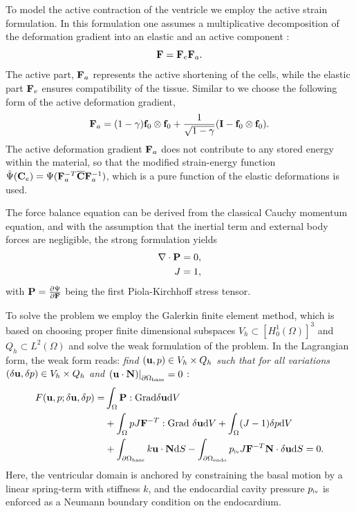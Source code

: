 To model the active contraction of the ventricle we employ the active
strain formulation. In this formulation one assumes a multiplicative 
decomposition of the deformation gradient into an elastic
and an active component \cite{ambrosi2011electromechanical}:
\begin{equation}
 \mathbf{F} = \mathbf{F}_e \mathbf{F}_a.
\label{paper4:eq:active_strain}
\end{equation}
The active part, $\mathbf{F}_a$ represents the active shortening of the cells,
while the elastic part $\mathbf{F}_e$ ensures compatibility of the tissue.
Similar to \cite{balaban2017high} we choose the following form of the active
deformation gradient,
\begin{equation}
  \mathbf{F}_a = (1 - \gamma) \mathbf{f}_0 \otimes \mathbf{f}_0  + \frac{1}{\sqrt{1 - \gamma}} (\mathbf{I} - \mathbf{f}_0 \otimes \mathbf{f}_0).
 \label{paper4:eq:active_strain_Fa_gjerald}
\end{equation}
The active deformation gradient $\mathbf{F}_a$ does not contribute to any
stored energy within the material, so that the modified
strain-energy function $\tilde{\Psi}(\mathbf{C}_e) = \Psi(\mathbf{F}_a^{-T} \overline{\mathbf{C}}
\mathbf{F}_a^{-1})$, which is a pure function of the elastic deformations is used.

The force balance equation can be derived from the classical Cauchy
momentum equation, and with the assumption that the inertial term and
external body forces are negligible, the strong formulation yields
\begin{align}
  \nabla \cdot \mathbf{P} &= 0, \\
  J &= 1, 
\end{align}
with $\mathbf{P} = \frac{\partial \Psi}{\partial \mathbf{F}}$ being the first
Piola-Kirchhoff stress tensor. 

To solve the problem we employ the Galerkin finite element method, which is based
on choosing proper finite dimensional subspaces $V_h \subset [H_0^1(\Omega)]^3$ and
$Q_h \subset L^2(\Omega)$ and solve the weak formulation of the problem. In
the Lagrangian form, the weak form reads: {\it find $(\mathbf{u},p)
\in V_h\times Q_h$ such that for all variations $(\delta
\mathbf{u}, \delta p) \in V_h \times Q_h $ and $\left. \left( \mathbf{u} \cdot \mathbf{N} \right)
\right|_{\partial \Omega_{\mathrm{base}}} = 0$ }:
\begin{align}
\begin{split}
  F(\mathbf{u}, p;\delta \mathbf{u}, \delta p) =
  &\int_{\Omega} \mathbf{P} :  \mathrm{Grad} \delta \mathbf{u}  \mathrm{d} V  \\
  &+\int_{\Omega} p J \mathbf{F}^{-T} : \mathrm{Grad} \ \delta \mathbf{u}   \mathrm{d} V  
  +\int_{\Omega} (J - 1) \delta p \mathrm{d} V \\
  &+\int_{\partial \Omega_{\text{base}}} k \mathbf{u} \cdot \mathbf{N} \mathrm{d}S
  - \int_{\partial \Omega_{\text{endo}}} p_{\textnormal{\tiny{lv}}} J \mathbf{F}^{-T} \mathbf{N} \cdot \delta \mathbf{u} \mathrm{d}S= 0.
  \label{paper4:eq:force_balance}
\end{split}
\end{align}
Here, the ventricular domain is anchored by constraining the basal
motion by a linear spring-term with stiffness $k$, and the
endocardial cavity pressure $p_{\textnormal{\tiny{lv}}}$ is enforced as a Neumann boundary
condition on the endocardium.  

